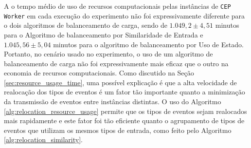 A o tempo médio de uso de recursos computacionais pelas instâncias de \texttt{CEP Worker} em cada execução do experimento não foi expressivamente diferente para o dois algoritmos de balanceamento de carga, sendo de  $1.049,2 \pm 4,51$ minutos para o Algoritmo de balanceamento por Similaridade de Entrada e $1.045,56 \pm 5,04$ minutos para o algoritmo de balanceamento por Uso de Estado. Portanto, no cenário usado no experimento, o uso de um algoritmo de balanceamento de carga não foi expressivamente mais eficaz que o outro na economia de recursos computacionais. Como discutido na Seção \ref{sec:resource_usage_time}, uma possível explicação é que a alta velocidade de realocação dos tipos de eventos é um fator tão importante quanto a minimização da transmissão de eventos entre instâncias distintas.  O uso do Algoritmo \ref{alg:relocation_resource_usage} permite que os tipos de eventos sejam realocados mais rapidamente e este fator foi tão eficiente quanto o agrupamento de tipos de eventos que utilizam os mesmos tipos de entrada, como feito pelo Algoritmo \ref{alg:relocation_similarity}.





